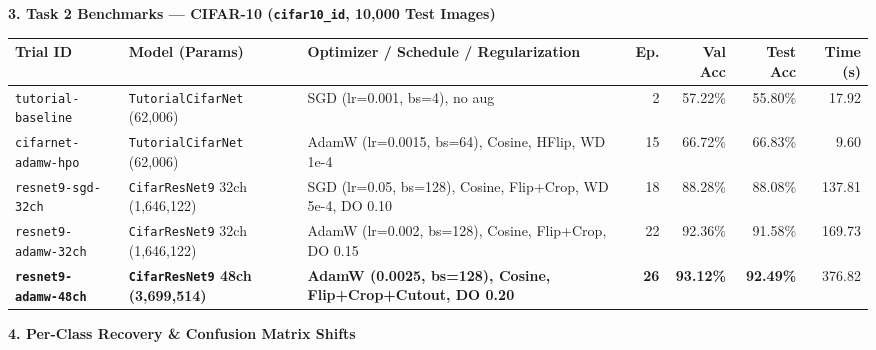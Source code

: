 \documentclass[10pt,a4paper]{article}
\begin{document}
\vspace{4pt}
\textbf{\textcolor{accent}{3. Task 2 Benchmarks --- CIFAR-10 (\texttt{cifar10\_id}, 10,000 Test Images)}}
\vspace{2pt}

{\scriptsize
\setlength{\tabcolsep}{4pt}
\begin{tabularx}{\textwidth}{@{}l l >{\raggedright\arraybackslash}X r r r r@{}}
\toprule
\textbf{Trial ID} & \textbf{Model (Params)} & \textbf{Optimizer / Schedule / Regularization} & \textbf{Ep.} & \textbf{Val Acc} & \textbf{Test Acc} & \textbf{Time (s)} \\
\midrule
\texttt{tutorial-baseline} & \texttt{TutorialCifarNet} (62,006) & SGD (lr=0.001, bs=4), no aug & 2 & 57.22\% & 55.80\% & 17.92 \\
\texttt{cifarnet-adamw-hpo} & \texttt{TutorialCifarNet} (62,006) & AdamW (lr=0.0015, bs=64), Cosine, HFlip, WD 1e-4 & 15 & 66.72\% & 66.83\% & 9.60 \\
\texttt{resnet9-sgd-32ch} & \texttt{CifarResNet9} 32ch (1,646,122) & SGD (lr=0.05, bs=128), Cosine, Flip+Crop, WD 5e-4, DO 0.10 & 18 & 88.28\% & 88.08\% & 137.81 \\
\texttt{resnet9-adamw-32ch} & \texttt{CifarResNet9} 32ch (1,646,122) & AdamW (lr=0.002, bs=128), Cosine, Flip+Crop, DO 0.15 & 22 & 92.36\% & 91.58\% & 169.73 \\
\textbf{\texttt{resnet9-adamw-48ch}} & \textbf{\texttt{CifarResNet9} 48ch (3,699,514)} & \textbf{AdamW (0.0025, bs=128), Cosine, Flip+Crop+Cutout, DO 0.20} & \textbf{26} & \textbf{93.12\%} & \textbf{92.49\%} & 376.82 \\
\bottomrule
\end{tabularx}
}

\vspace{4pt}
\textbf{\textcolor{accent}{4. Per-Class Recovery \& Confusion Matrix Shifts}}
\vspace{2pt}
\end{document}
